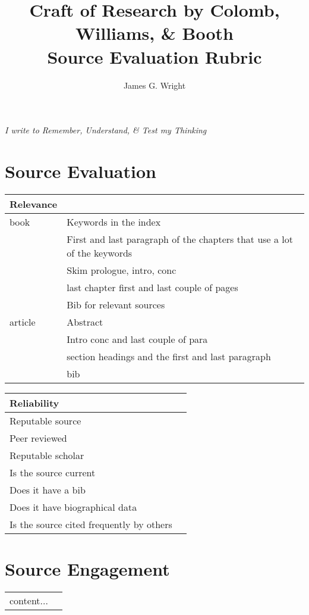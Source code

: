 \documentclass[10pt, a4paper]{article}
\begin{document}
	\title{Craft of Research by Colomb, Williams, \& Booth\cite{booth2009craft}
		\\Source Evaluation Rubric}
	\author{James G. Wright }
	\maketitle
	\begin{center}
		\emph{I write to Remember, Understand, \& Test my Thinking}
	\end{center}
	
	\newpage
\section{Source Evaluation}
\begin{center}
	\begin{tabular}{|l |l|}
		\hline
		Relevance &\\
		\hline
		book &Keywords in the index\\
		&First and last paragraph of the chapters that use a lot of the keywords\\
		&Skim prologue, intro, conc\\
		&last chapter first and last couple of pages\\
		&Bib for relevant sources\\
		\hline
		article & Abstract\\
		&Intro conc and last couple of para\\
		&section headings and the first and last paragraph\\
		&bib\\
		\hline		
	\end{tabular}
\end{center}
\begin{center}
	\begin{tabular}{|l |l|}
		\hline
		Reliability&\\
		\hline
		Reputable source&\\
		\hline
		Peer reviewed&\\
		\hline
		Reputable scholar&\\
		\hline
		Is the source current&\\
		\hline
		Does it have a bib&\\
		\hline
		Does it have biographical data&\\
		\hline
		Is the source cited frequently by others&\\
		\hline
	\end{tabular}
\end{center}
\section{Source Engagement}
\begin{center}
	\begin{tabular}{|l |l|}
		content...
	\end{tabular}
\end{center}


\end{document}
